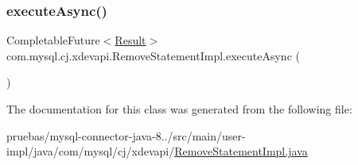 \subsubsection{\texorpdfstring{execute\+Async()}{executeAsync()}}
{\footnotesize\ttfamily Completable\+Future$<$\mbox{\hyperlink{interfacecom_1_1mysql_1_1cj_1_1xdevapi_1_1_result}{Result}}$>$ com.\+mysql.\+cj.\+xdevapi.\+Remove\+Statement\+Impl.\+execute\+Async (\begin{DoxyParamCaption}{ }\end{DoxyParamCaption})}



The documentation for this class was generated from the following file\+:\begin{DoxyCompactItemize}
\item 
pruebas/mysql-\/connector-\/java-\/8../src/main/user-\/impl/java/com/mysql/cj/xdevapi/\mbox{\hyperlink{_remove_statement_impl_8java}{Remove\+Statement\+Impl.\+java}}\end{DoxyCompactItemize}
